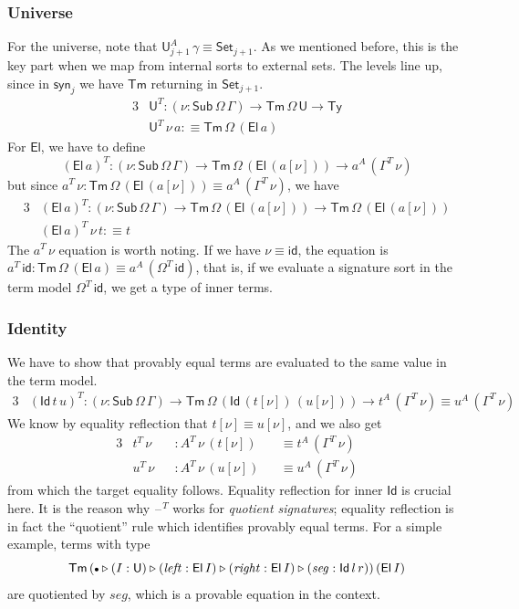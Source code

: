 \documentclass[12pt,a4paper,twoside,openany]{book}
\theoremstyle{remark}
\theoremstyle{definition}
\theoremstyle{theorem}
\newcommand{\mi}[1]{\mathit{#1}}
\newcommand{\id}{\mathsf{id}}
\newcommand{\Sub}{\mathsf{Sub}}
\newcommand{\Tm}{\mathsf{Tm}}
\newcommand{\Ty}{\mathsf{Ty}}
\newcommand{\U}{\mathsf{U}}
\newcommand{\El}{\mathsf{El}}
\newcommand{\Id}{\mathsf{Id}}
\newcommand{\blank}{\mathord{\hspace{1pt}\text{--}\hspace{1pt}}}
\newcommand{\Set}{\mathsf{Set}}
\newcommand{\ext}{\triangleright}
\newcommand{\emptycon}{\scaleobj{.75}\bullet}
\newcommand{\syn}{\mathsf{syn}}
\newcommand{\defn}{:\equiv}
\begin{document}
\subsubsection{Universe}
For the universe, note that $\U^A_{j+1}\,\gamma \equiv \Set_{j+1}$.  As we
mentioned before, this is the key part when we map from internal sorts to
external sets. The levels line up, since in $\syn_j$ we have $\Tm$ returning in $\Set_{j+1}$.
\begin{alignat*}{3}
  &\U^T : (\nu : \Sub\,\Omega\,\Gamma) \to \Tm\,\Omega\,\U \to
          \Ty\\
  &\U^T\,\nu\,a \defn \Tm\,\Omega\,(\El\,a)
\end{alignat*}
For $\El$, we have to define
\[
  (\El\,a)^T : (\nu : \Sub\,\Omega\,\Gamma)
          \to \Tm\,\Omega\,(\El\,(a[\nu])) \to a^A\,(\Gamma^T\,\nu)
\]
but since $a^T\,\nu : \Tm\,\Omega\,(\El\,(a[\nu]))
      \equiv a^A\,(\Gamma^T\,\nu)$, we have
\begin{alignat*}{3}
  &(\El\,a)^T : (\nu : \Sub\,\Omega\,\Gamma)
          \to \Tm\,\Omega\,(\El\,(a[\nu])) \to \Tm\,\Omega\,(\El\,(a[\nu]))\\
  &(\El\,a)^T\,\nu\,t \defn t
\end{alignat*}
The $a^T\,\nu$ equation is worth noting. If we have $\nu \equiv \id$, the
equation is $a^T\,\id : \Tm\,\Omega\,(\El\,a) \equiv
a^A\,(\Omega^T\,\id)$, that is, if we evaluate a signature sort in the term
model $\Omega^T\,\id$, we get a type of inner terms.

\subsubsection{Identity}
We have to show that provably equal terms are evaluated to the same value in the
term model.
\begin{alignat*}{3}
  &(\Id\,t\,u)^T : (\nu : \Sub\,\Omega\,\Gamma)
    \to \Tm\,\Omega\,(\Id\,(t[\nu])\,(u[\nu])) \to t^A\,(\Gamma^T\,\nu) \equiv u^A\,(\Gamma^T\,\nu)
\end{alignat*}
We know by equality reflection that $t[\nu] \equiv u[\nu]$, and
we also get
\begin{alignat*}{3}
  &t^T\,\nu &&: A^T\,\nu\,(t[\nu]) &&\equiv t^A\,(\Gamma^T\,\nu)\\
  &u^T\,\nu &&: A^T\,\nu\,(u[\nu]) &&\equiv u^A\,(\Gamma^T\,\nu)
\end{alignat*}
from which the target equality follows. Equality reflection for inner $\Id$ is
crucial here. It is the reason why $\blank^T$ works for \emph{quotient
signatures}; equality reflection is in fact the ``quotient'' rule which
identifies provably equal terms. For a simple example, terms with type
\[
  \Tm\,
  (\emptycon \ext (I : \U) \ext (\mi{left} : \El\,I) \ext (\mi{right} : \El\,I) \ext (\mi{seg} : \Id\,l\,r))\,
  (\El\,I)
\]
are quotiented by $\mi{seg}$, which is a provable equation in the context.
\end{document}

